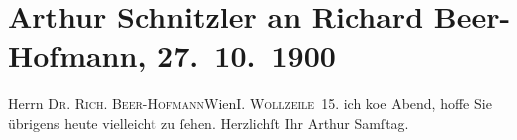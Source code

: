 

         
         \renewcommand{\erwaehntePersonen}{Personen: Richard Beer-Hofmann}
         \renewcommand{\erwaehnteOrte}{Orte: I., Innere Stadt, IX., Alsergrund, Wien, Wollzeile}
         \renewcommand{\erwaehnteWerke}{}
               \section[Arthur Schnitzler an Richard Beer-Hofmann, 27. 10. 1900]{ Arthur Schnitzler an Richard Beer-Hofmann, 27. 10. 1900}\nopagebreak{}\rehead{ }\begin{ledgroupsized}[t]{13cm}\normalsize\beginnumbering \toendnotes[C]{\smallbreak\pagebreak[2]} 
\toendnotes[C]{\smallbreak}\pstart{}{\pb}Herrn \textsc{Dr. Rich.
                     Beer-Hofmann}\pend{}\pstart{}Wien\pend{}\pstart{}\textsc{I. Wollzeile 15.}\pend{}{\bigskip}\pstart
           \noindent{}{\pb}ich ko{\geminationm}e \label{K_L01080_1v}\label{K_L01080_1h} Abend, hoffe Sie übrigens heute vielleich\textcolor{gray}{t} zu ſehen.
               Herzlichſt Ihr \spacefill\mbox{Arthur}\pend
           \pstart
           Samſtag. \pend
           
         
         \endnumbering{}\end{ledgroupsized}  \newcommand{\dateiname}{L01080}\newcommand{\titel}{Arthur Schnitzler an Richard Beer-Hofmann, 27. 10. 1900}\newcommand{\editorInnen}{Martin Anton Müller und Gerd-Hermann Susen}
      